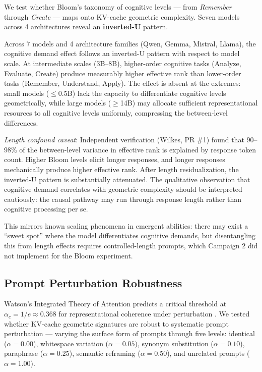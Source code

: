 \documentclass[11pt,a4paper]{article}
\begin{document}
We test whether Bloom's taxonomy of cognitive levels \citep{bloom1956taxonomy} --- from \emph{Remember} through \emph{Create} --- maps onto KV-cache geometric complexity. Seven models across 4 architectures reveal an \textbf{inverted-U} pattern.

Across 7 models and 4 architecture families (Qwen, Gemma, Mistral, Llama), the cognitive demand effect follows an inverted-U pattern with respect to model scale. At intermediate scales (3B--8B), higher-order cognitive tasks (Analyze, Evaluate, Create) produce measurably higher effective rank than lower-order tasks (Remember, Understand, Apply). The effect is absent at the extremes: small models ($\leq$0.5B) lack the capacity to differentiate cognitive levels geometrically, while large models ($\geq$14B) may allocate sufficient representational resources to all cognitive levels uniformly, compressing the between-level differences.

\emph{Length confound caveat}: Independent verification (Wilkes, PR \#1) found that 90--98\% of the between-level variance in effective rank is explained by response token count. Higher Bloom levels elicit longer responses, and longer responses mechanically produce higher effective rank. After length residualization, the inverted-U pattern is substantially attenuated. The qualitative observation that cognitive demand correlates with geometric complexity should be interpreted cautiously: the causal pathway may run through response length rather than cognitive processing per se.

This mirrors known scaling phenomena in emergent abilities: there may exist a ``sweet spot'' where the model differentiates cognitive demands, but disentangling this from length effects requires controlled-length prompts, which Campaign 2 did not implement for the Bloom experiment.

\subsection{Prompt Perturbation Robustness}
\label{sec:rdct}

Watson's Integrated Theory of Attention predicts a critical threshold at $\alpha_c = 1/e \approx 0.368$ for representational coherence under perturbation \citep{watson2019ita}. We tested whether KV-cache geometric signatures are robust to systematic prompt perturbation --- varying the surface form of prompts through five levels: identical ($\alpha = 0.00$), whitespace variation ($\alpha = 0.05$), synonym substitution ($\alpha = 0.10$), paraphrase ($\alpha = 0.25$), semantic reframing ($\alpha = 0.50$), and unrelated prompts ($\alpha = 1.00$).
\end{document}
